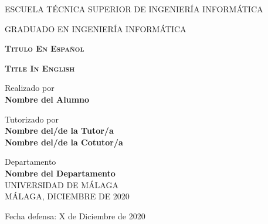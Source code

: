 \begin{titlepage}
    \selectfont
    
    \begin{center}
        {\large ESCUELA TÉCNICA SUPERIOR DE INGENIERÍA INFORMÁTICA}

        \vspace{0.1cm}
        {\large GRADUADO EN INGENIERÍA INFORMÁTICA}

        \vspace{2cm}
        \Large
        \textbf{\textsc{Titulo En Español}}
        \vspace{1cm}
        
        \Large
        \textbf{\textsc{Title In English}}

        \vspace{2cm}
        \large
        Realizado por\\
        \textbf{Nombre del Alumno}

        \vspace{1cm}
        \large
        Tutorizado por\\
        \textbf{Nombre del/de la Tutor/a\\
        Nombre del/de la Cotutor/a}

        \vspace{1cm}
        \large
        Departamento\\
        \textbf{Nombre del Departamento}\\

        \vspace{2cm}
        \large
        UNIVERSIDAD DE MÁLAGA
        \\
        MÁLAGA, DICIEMBRE DE 2020
    \end{center}
    \begin{flushright}
        \vspace{1.5cm}
        Fecha defensa: X de Diciembre de 2020
    \end{flushright}
\end{titlepage}

\begingroup
    \pagestyle{empty}
    \cleardoublepage
\endgroup
